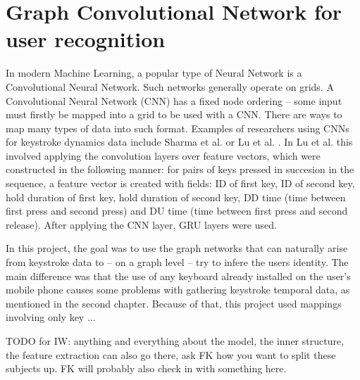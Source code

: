 
\section{Graph Convolutional Network for user recognition}

In modern Machine Learning, a popular type of Neural Network is a Convolutional Neural Network. Such networks generally operate on grids. A Convolutional Neural Network (CNN) has a fixed node ordering -- some input must firstly be mapped into a grid to be used with a CNN. There are ways to map many types of data into such format. Examples of researchers using CNNs for keystroke dynamics data include Sharma et al. \cite{Shar2023} or Lu et al. \cite{Lu2020}. In Lu et al. this involved applying the convolution layers over feature vectors, which were constructed in the following manner: for pairs of keys pressed in succesion in the sequence, a feature vector is created with fields: ID of first key, ID of second key, hold duration of first key, hold duration of second key, DD time (time between first press and second press) and DU time (time between first press and second release). After applying the CNN layer, GRU layers were used.

In this project, the goal was to use the graph networks that can naturally arise from keystroke data to -- on a graph level -- try to infere the users identity. The main difference was that the use of any keyboard already installed on the user's mobile phone causes some problems with gathering keystroke temporal data, as mentioned in the second chapter. Because of that, this project used mappings involving only key ...

TODO for IW: anything and everything about the model, the inner structure, the feature extraction can also go there, ask FK how you want to split these subjects up. FK will probably also check in with something here.

